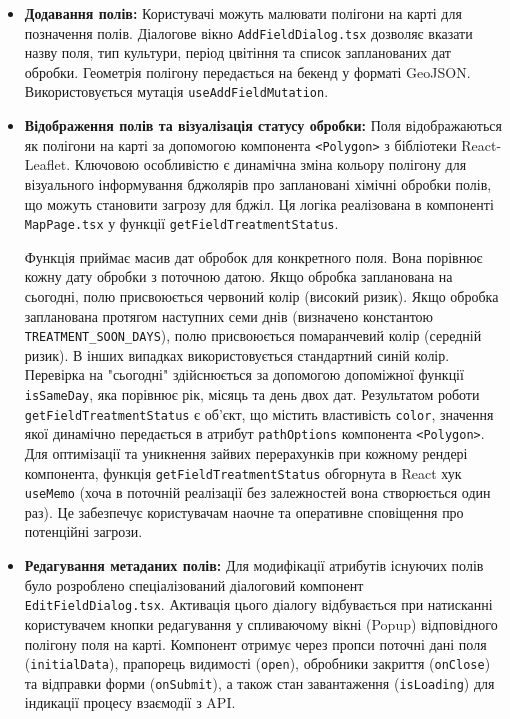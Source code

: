 \begin{itemize}
    \item \textbf{Додавання полів:} Користувачі можуть малювати полігони на карті для позначення полів. Діалогове вікно \texttt{AddFieldDialog.tsx} дозволяє вказати назву поля, тип культури, період цвітіння та список запланованих дат обробки. Геометрія полігону передається на бекенд у форматі GeoJSON. Використовується мутація \texttt{useAddFieldMutation}.
    
    \item \textbf{Відображення полів та візуалізація статусу обробки:} 
    Поля відображаються як полігони на карті за допомогою компонента \texttt{<Polygon>} з бібліотеки React-Leaflet. Ключовою особливістю є динамічна зміна кольору полігону для візуального інформування бджолярів про заплановані хімічні обробки полів, що можуть становити загрозу для бджіл. Ця логіка реалізована в компоненті \texttt{MapPage.tsx} у функції \texttt{getFieldTreatmentStatus}. 
    
    Функція приймає масив дат обробок для конкретного поля. Вона порівнює кожну дату обробки з поточною датою. Якщо обробка запланована на сьогодні, полю присвоюється червоний колір (високий ризик). Якщо обробка запланована протягом наступних семи днів (визначено константою \texttt{TREATMENT\_SOON\_DAYS}), полю присвоюється помаранчевий колір (середній ризик). В інших випадках використовується стандартний синій колір. Перевірка на "сьогодні" здійснюється за допомогою допоміжної функції \texttt{isSameDay}, яка порівнює рік, місяць та день двох дат. Результатом роботи \texttt{getFieldTreatmentStatus} є об'єкт, що містить властивість \texttt{color}, значення якої динамічно передається в атрибут \texttt{pathOptions} компонента \texttt{<Polygon>}. Для оптимізації та уникнення зайвих перерахунків при кожному рендері компонента, функція \texttt{getFieldTreatmentStatus} обгорнута в React хук \texttt{useMemo} (хоча в поточній реалізації без залежностей вона створюється один раз). Це забезпечує користувачам наочне та оперативне сповіщення про потенційні загрози.

    \item \textbf{Редагування метаданих полів:} 
    Для модифікації атрибутів існуючих полів було розроблено спеціалізований діалоговий компонент \texttt{EditFieldDialog.tsx}. Активація цього діалогу відбувається при натисканні користувачем кнопки редагування у спливаючому вікні (Popup) відповідного полігону поля на карті. Компонент отримує через пропси поточні дані поля (\texttt{initialData}), прапорець видимості (\texttt{open}), обробники закриття (\texttt{onClose}) та відправки форми (\texttt{onSubmit}), а також стан завантаження (\texttt{isLoading}) для індикації процесу взаємодії з API.
    

\end{itemize}
